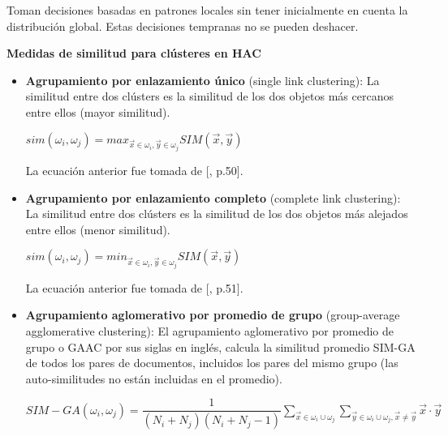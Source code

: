 \documentclass{llncs}
\begin{document}
Toman decisiones basadas en patrones locales sin tener inicialmente en cuenta la distribución global. Estas decisiones tempranas no se pueden deshacer.

\vspace{1em}
\textbf{Medidas de similitud para cl\'usteres en HAC}

\begin{itemize}
	\item \textbf{Agrupamiento por enlazamiento \'unico} (single link clustering): La similitud entre dos cl\'usters es la similitud de los dos objetos más cercanos entre ellos (mayor similitud).
	
	\begin{center}
		$ sim(\omega_{i}, \omega_{j}) = max_{\overrightarrow{x} \in \omega_{i}, \overrightarrow{y} \in \omega_{j}} SIM(\overrightarrow{x}, \overrightarrow{y})$
	\end{center}
	
	La ecuaci\'on anterior fue tomada de [\cite{B2}, p.50].
	
	\vspace{1em}
	\item \textbf{Agrupamiento por enlazamiento completo} (complete link clustering): La similitud entre dos cl\'usters es la similitud de los dos objetos más alejados entre ellos (menor similitud). 
	
	\begin{center}
		$ sim(\omega_{i}, \omega_{j}) = min_{\overrightarrow{x} \in \omega_{i}, \overrightarrow{y} \in \omega_{j}} SIM(\overrightarrow{x}, \overrightarrow{y})$
	\end{center}
	
	La ecuaci\'on anterior fue tomada de [\cite{B2}, p.51].
	
	\vspace{1em}
	\item \textbf{Agrupamiento aglomerativo por promedio de grupo} (group-average agglomerative clustering): El agrupamiento aglomerativo por promedio de grupo o GAAC por sus siglas en ingl\'es, calcula la similitud promedio SIM-GA de todos los pares de documentos, incluidos los pares del mismo grupo (las auto-similitudes no están incluidas en el promedio).
	
	\begin{center}
	\footnotesize
	$ SIM-GA(\omega_{i}, \omega_{j}) = \dfrac{1}{(N_{i} + N_{j})(N_{i} + N_{j} - 1)} \sum_{\overrightarrow{x} \in \omega_{i} \cup \omega_{j}} \sum_{\overrightarrow{y} \in \omega_{i} \cup \omega_{j}, \overrightarrow{x} \neq \overrightarrow{y}} \overrightarrow{x} \cdot \overrightarrow{y} $
	\end{center}
	

\end{itemize}
\end{document}
